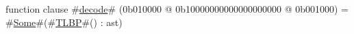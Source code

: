 function clause #\hyperref[zdecode]{decode}# (0b010000 @ 0b10000000000000000000 @ 0b001000) = #\hyperref[zSome]{Some}#(#\hyperref[zTLBP]{TLBP}#() : ast)
